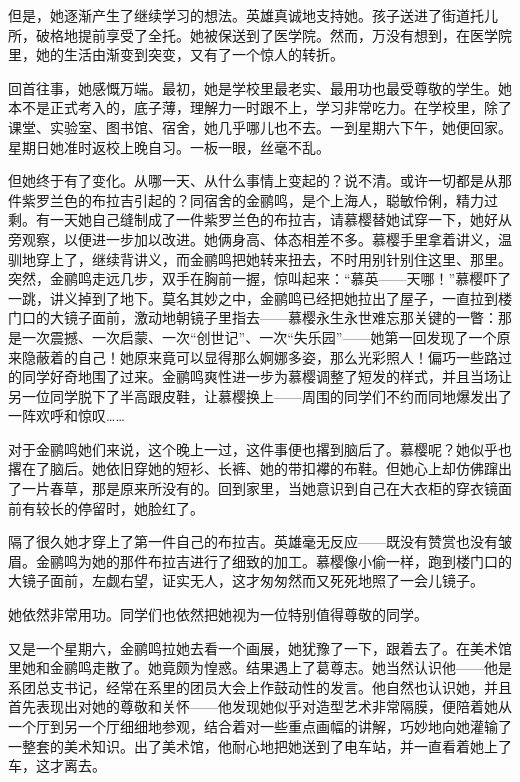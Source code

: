 \par 但是，她逐渐产生了继续学习的想法。英雄真诚地支持她。孩子送进了街道托儿所，破格地提前享受了全托。她被保送到了医学院。然而，万没有想到，在医学院里，她的生活由渐变到突变，又有了一个惊人的转折。
\par 回首往事，她感慨万端。最初，她是学校里最老实、最用功也最受尊敬的学生。她本不是正式考入的，底子薄，理解力一时跟不上，学习非常吃力。在学校里，除了课堂、实验室、图书馆、宿舍，她几乎哪儿也不去。一到星期六下午，她便回家。星期日她准时返校上晚自习。一板一眼，丝毫不乱。
\par 但她终于有了变化。从哪一天、从什么事情上变起的？说不清。或许一切都是从那件紫罗兰色的布拉吉引起的？同宿舍的金鹂鸣，是个上海人，聪敏伶俐，精力过剩。有一天她自己缝制成了一件紫罗兰色的布拉吉，请慕樱替她试穿一下，她好从旁观察，以便进一步加以改进。她俩身高、体态相差不多。慕樱手里拿着讲义，温驯地穿上了，继续背讲义，而金鹂鸣把她转来扭去，不时用别针别住这里、那里。突然，金鹂鸣走远几步，双手在胸前一握，惊叫起来：“慕英——天哪！”慕樱吓了一跳，讲义掉到了地下。莫名其妙之中，金鹂鸣已经把她拉出了屋子，一直拉到楼门口的大镜子面前，激动地朝镜子里指去——慕樱永生永世难忘那关键的一瞥：那是一次震撼、一次启蒙、一次“创世记”、一次“失乐园”——她第一回发现了一个原来隐蔽着的自己！她原来竟可以显得那么婀娜多姿，那么光彩照人！偏巧一些路过的同学好奇地围了过来。金鹂鸣爽性进一步为慕樱调整了短发的样式，并且当场让另一位同学脱下了半高跟皮鞋，让慕樱换上——周围的同学们不约而同地爆发出了一阵欢呼和惊叹……
\par 对于金鹂鸣她们来说，这个晚上一过，这件事便也撂到脑后了。慕樱呢？她似乎也撂在了脑后。她依旧穿她的短衫、长裤、她的带扣襻的布鞋。但她心上却仿佛蹿出了一片春草，那是原来所没有的。回到家里，当她意识到自己在大衣柜的穿衣镜面前有较长的停留时，她脸红了。
\par 隔了很久她才穿上了第一件自己的布拉吉。英雄毫无反应——既没有赞赏也没有皱眉。金鹂鸣为她的那件布拉吉进行了细致的加工。慕樱像小偷一样，跑到楼门口的大镜子面前，左觑右望，证实无人，这才匆匆然而又死死地照了一会儿镜子。
\par 她依然非常用功。同学们也依然把她视为一位特别值得尊敬的同学。
\par 又是一个星期六，金鹂鸣拉她去看一个画展，她犹豫了一下，跟着去了。在美术馆里她和金鹂鸣走散了。她竟颇为惶惑。结果遇上了葛尊志。她当然认识他——他是系团总支书记，经常在系里的团员大会上作鼓动性的发言。他自然也认识她，并且首先表现出对她的尊敬和关怀——他发现她似乎对造型艺术非常隔膜，便陪着她从一个厅到另一个厅细细地参观，结合着对一些重点画幅的讲解，巧妙地向她灌输了一整套的美术知识。出了美术馆，他耐心地把她送到了电车站，并一直看着她上了车，这才离去。
